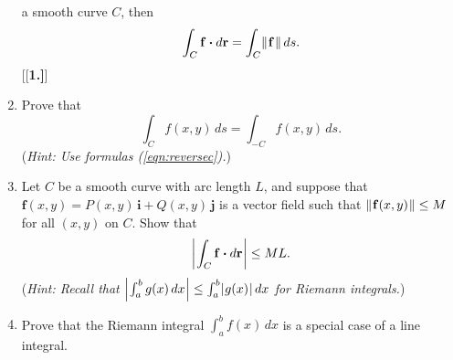 \begin{enumerate}[\bfseries 1.]
  a smooth curve $C$, then 
  \[\int_C \mathbf{f} \bm{\cdot} d\mathbf{r} = \int_C \lVert\mspace{1mu}\mathbf{f}\mspace{1mu}\rVert\,ds.\]
[{[\bfseries 1.]}]
 \item Prove that \[\int_C f(x,y)\,ds = \int_{-C} f(x,y)\,ds.\] 
 (\emph{Hint: Use formulas (\ref{eqn:reversec}).})
 \item Let $C$ be a smooth curve with arc length $L$, and suppose that $\mathbf{f}(x,y) = P(x,y)\,\mathbf{i} +
  Q(x,y)\,\mathbf{j}$ is a vector field such that $\lVert\mspace{1mu}\mathbf{f}(x,y)\mspace{1mu}\rVert \le M$ for all $(x,y)$ on $C$. Show
  that
  \[\left|\mspace{1mu}\int_C \mathbf{f} \bm{\cdot} d\mathbf{r}\mspace{1mu}\right| \le ML.\]
  (\emph{Hint: Recall that $\left|\mspace{1mu}\int_a^b g(x)\,dx\mspace{1mu}\right| \le \int_a^b \lvert\mspace{1mu}g(x)\mspace{1mu}\rvert\,dx$ for Riemann integrals.})
 \item Prove that the Riemann integral $\int_a^b f(x)\,dx$ is a special case of a line integral.
\end{enumerate}
\newpage
